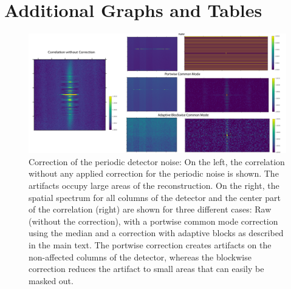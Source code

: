 \chapter{Additional Graphs and Tables}


\begin{figure}[h!]
	\centering
	\includegraphics[width=\linewidth]{images/correction.pdf}
	\caption[Correction of periodic detector noise]{Correction of the periodic detector noise: On the left, the correlation without any applied correction for the periodic noise is shown. The artifacts occupy large areas of the reconstruction. On the right, the spatial spectrum for all columns of the detector and the center part of the correlation (right) are shown for three different cases: Raw (without the correction), with a portwise common mode correction using the median and a correction with adaptive blocks as described in the main text. The portwise correction creates artifacts on the non-affected columns of the detector, whereas the blockwise correction reduces the artifact to small areas that can easily be masked out.}
	\label{fig:app_correction}
\end{figure}

